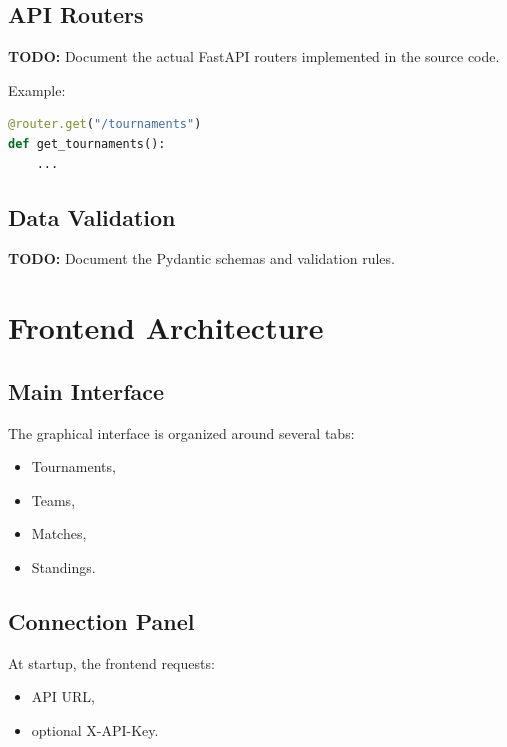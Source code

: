 \documentclass[12pt,a4paper]{article}
\begin{document}
\subsection{API Routers}

\textbf{TODO:} Document the actual FastAPI routers implemented in
the source code.

Example:

\begin{lstlisting}[language=python]
@router.get("/tournaments")
def get_tournaments():
    ...
\end{lstlisting}

\subsection{Data Validation}

\textbf{TODO:} Document the Pydantic schemas and validation rules.


\section{Frontend Architecture}

\subsection{Main Interface}

The graphical interface is organized around several tabs:

\begin{itemize}
    \item Tournaments,
    \item Teams,
    \item Matches,
    \item Standings.
\end{itemize}

\subsection{Connection Panel}

At startup, the frontend requests:

\begin{itemize}
    \item API URL,
    \item optional X-API-Key.
\end{itemize}
\end{document}
